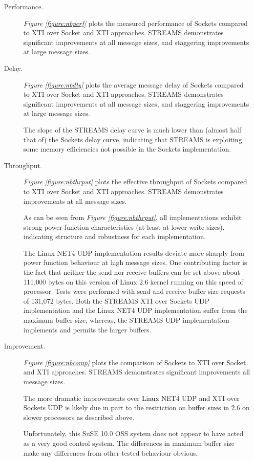\documentclass[letterpaper,final,notitlepage,twocolumn,10pt,twoside]{article}
\begin{document}
\begin{description}

\item[Performance.]

\textit{Figure \ref{figure:nbperf}}
plots the measured performance of Sockets compared to XTI over Socket and XTI approaches.  STREAMS
demonstrates significant improvements at all message sizes, and staggering improvements at large
message sizes.

\item[Delay.]

\textit{Figure \ref{figure:nbdly}}
plots the average message delay of Sockets compared to XTI over Socket and XTI approaches.  STREAMS
demonstrates significant improvements at all message sizes, and staggering improvements at large
message sizes.

The slope of the STREAMS delay curve is much lower than (almost half that of) the Sockets delay
curve, indicating that STREAMS is exploiting some memory efficiencies not possible in the Sockets
implementation.

\item[Throughput.]

\textit{Figure \ref{figure:nbthrput}}
plots the effective throughput of Sockets compared to XTI over Socket and XTI approaches.  STREAMS
demonstrates improvements at all message sizes.

As can be seen from \textit{Figure \ref{figure:nbthrput}}, all implementations exhibit strong power
function characteristics (at least at lower write sizes), indicating structure and robustness for
each implementation.

The Linux NET4 UDP implementation results deviate more sharply from power function behaviour at high
message sizes.  One contributing factor is the fact that neither the send nor receive buffers can be
set above about 111,000 bytes on this version of Linux 2.6 kernel running on this speed of
processor.  Tests were performed with send and receive buffer size requests of 131,072 bytes.  Both
the STREAMS XTI over Sockets UDP implementation and the Linux NET4 UDP implementation suffer from
the maximum buffer size, whereas, the STREAMS UDP implementation implements and permits the larger
buffers.

\item[Improvement.]

\textit{Figure \ref{figure:nbcomp}}
plots the comparison of Sockets to XTI over Socket and XTI approaches.  STREAMS demonstrates
significant improvements all message sizes.

The more dramatic improvements over Linux NET4 UDP and XTI over Sockets UDP is likely due in part to
the restriction on buffer sizes in 2.6 on slower processors as described above.

Unfortunately, this SuSE 10.0 OSS system does not appear to have acted as a very good control
system.  The differences in maximum buffer size make any differences from other tested behaviour
obvious.

\end{description}
\end{document}
